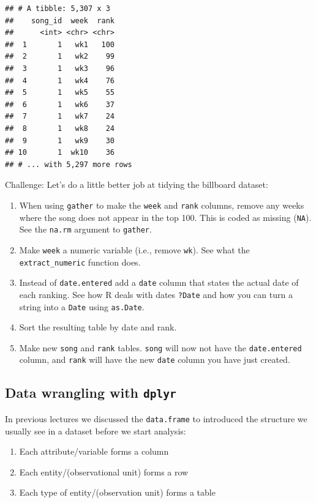 \documentclass[]{article}
\theoremstyle{definition}
\theoremstyle{definition}
\theoremstyle{remark}
\begin{document}
\begin{verbatim}
## # A tibble: 5,307 x 3
##    song_id  week  rank
##      <int> <chr> <chr>
##  1       1   wk1   100
##  2       1   wk2    99
##  3       1   wk3    96
##  4       1   wk4    76
##  5       1   wk5    55
##  6       1   wk6    37
##  7       1   wk7    24
##  8       1   wk8    24
##  9       1   wk9    30
## 10       1  wk10    36
## # ... with 5,297 more rows
\end{verbatim}

Challenge: Let's do a little better job at tidying the billboard
dataset:

\begin{enumerate}
\def\labelenumi{\arabic{enumi}.}
\itemsep1pt\parskip0pt
\item
  When using \texttt{gather} to make the \texttt{week} and \texttt{rank}
  columns, remove any weeks where the song does not appear in the top
  100. This is coded as missing (\texttt{NA}). See the \texttt{na.rm}
  argument to \texttt{gather}.\\
\item
  Make \texttt{week} a numeric variable (i.e., remove \texttt{wk}). See
  what the \texttt{extract\_numeric} function does.\\
\item
  Instead of \texttt{date.entered} add a \texttt{date} column that
  states the actual date of each ranking. See how R deals with dates
  \texttt{?Date} and how you can turn a string into a \texttt{Date}
  using \texttt{as.Date}.\\
\item
  Sort the resulting table by date and rank.
\item
  Make new \texttt{song} and \texttt{rank} tables. \texttt{song} will
  now not have the \texttt{date.entered} column, and \texttt{rank} will
  have the new \texttt{date} column you have just created.
\end{enumerate}

\subsection{\texorpdfstring{Data wrangling with
\texttt{dplyr}}{Data wrangling with dplyr}}\label{data-wrangling-with-dplyr}

In previous lectures we discussed the \texttt{data.frame} to introduced
the structure we usually see in a dataset before we start analysis:

\begin{enumerate}
\def\labelenumi{\arabic{enumi}.}
\itemsep1pt\parskip0pt
\item
  Each attribute/variable forms a column
\item
  Each entity/(observational unit) forms a row
\item
  Each type of entity/(observation unit) forms a table
\end{enumerate}
\end{document}
